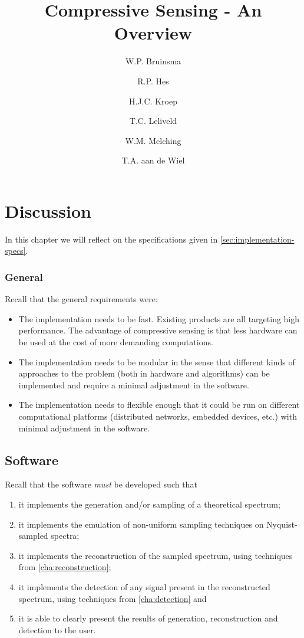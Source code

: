 \documentclass[a4paper, openany, oneside]{memoir}
\title{Compressive Sensing - An Overview}
\author{W.P. Bruinsma \and R.P. Hes \and H.J.C. Kroep \and T.C. Leliveld \and W.M. Melching \and T.A. aan de Wiel}
\begin{document}
\chapter{Discussion}
In this chapter we will reflect on the specifications given in \cref{sec:implementation-specs}.

\subsection{General}
Recall that the general requirements were:
\begin{itemize}
    \item The implementation needs to be fast. Existing products are all targeting high performance. The advantage of compressive sensing is that less hardware can be used at the cost of more demanding computations.
    \item The implementation needs to be modular in the sense that different kinds of approaches to the problem (both in hardware and algorithms) can be implemented and require a minimal adjustment in the software.
    \item The implementation needs to flexible enough that it could be run on different computational platforms (distributed networks, embedded devices, etc.) with minimal adjustment in the software.
\end{itemize}



\section{Software}
Recall that the software \emph{must} be developed such that
\begin{enumerate}
    \item it implements the generation and/or sampling of a theoretical spectrum;
    \item it implements the emulation of non-uniform sampling techniques on Nyquist-sampled spectra;
    \item it implements the reconstruction of the sampled spectrum, using techniques from \cref{cha:reconstruction};
    \item it implements the detection of any signal present in the reconstructed spectrum, using techniques from \cref{cha:detection} and
    \item it is able to clearly present the results of generation, reconstruction and detection to the user.
\end{enumerate}
\end{document}
